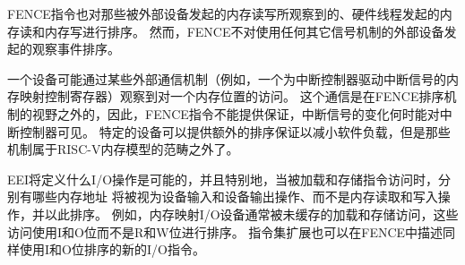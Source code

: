 FENCE指令也对那些被外部设备发起的内存读写所观察到的、硬件线程发起的内存读和内存写进行排序。
然而，FENCE不对使用任何其它信号机制的外部设备发起的观察事件排序。

\begin{commentary}
一个设备可能通过某些外部通信机制（例如，一个为中断控制器驱动中断信号的内存映射控制寄存器）观察到对一个内存位置的访问。
这个通信是在FENCE排序机制的视野之外的，因此，FENCE指令不能提供保证，中断信号的变化何时能对中断控制器可见。
特定的设备可以提供额外的排序保证以减小软件负载，但是那些机制属于RISC-V内存模型的范畴之外了。
\end{commentary}

EEI将定义什么I/O操作是可能的，并且特别地，当被加载和存储指令访问时，分别有哪些内存地址
将被视为设备输入和设备输出操作、而不是内存读取和写入操作，并以此排序。
例如，内存映射I/O设备通常被未缓存的加载和存储访问，这些访问使用I和O位而不是R和W位进行排序。
指令集扩展也可以在FENCE中描述同样使用I和O位排序的新的I/O指令。


